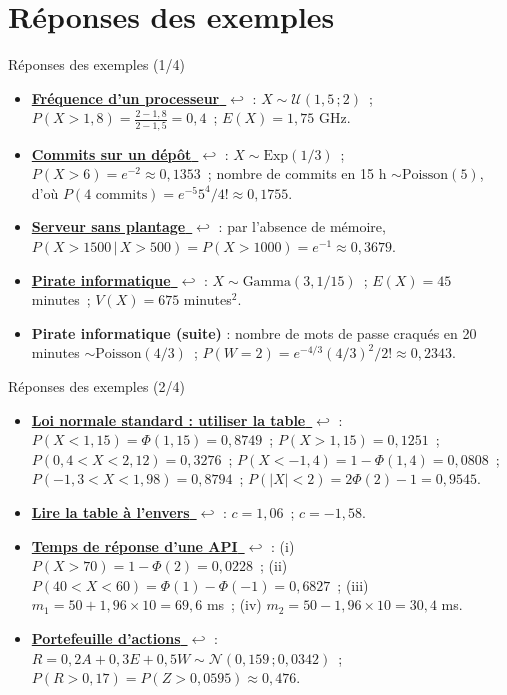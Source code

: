 \documentclass{BeamerTemplate}
\newcommand{\retour}[2]{\hyperlink{#1}{\textbf{#2}~{\color{gray}$\hookleftarrow$}}}
\begin{document}
\section{Réponses des exemples}

\begin{frame}[t,label=rep-ex1]{Réponses des exemples (1/4)}
\footnotesize
\begin{itemize}\itemsep4pt
\item \retour{exfreq}{Fréquence d'un processeur} : $X\sim\mathcal{U}(1{,}5\,;2)$~;
$P(X>1{,}8)=\frac{2-1{,}8}{2-1{,}5}=0{,}4$~; $E(X)=1{,}75$ GHz.
\item \retour{excommits}{Commits sur un dépôt} : $X\sim\text{Exp}(1/3)$~; $P(X>6)=e^{-2}\approx0{,}1353$~;
nombre de commits en 15 h $\sim\text{Poisson}(5)$, d'où $P(4\text{ commits})=e^{-5}5^4/4!\approx0{,}1755$.
\item \retour{exserveur}{Serveur sans plantage} : par l'absence de mémoire,
$P(X>1500\,|\,X>500)=P(X>1000)=e^{-1}\approx0{,}3679$.
\item \retour{expirate}{Pirate informatique} : $X\sim\text{Gamma}(3,1/15)$~; $E(X)=45$ minutes~;
$V(X)=675$ minutes$^2$.
\item \textbf{Pirate informatique (suite)} : nombre de mots de passe craqués en 20 minutes
$\sim\text{Poisson}(4/3)$~; $P(W=2)=e^{-4/3}(4/3)^2/2!\approx0{,}2343$.
\end{itemize}
\end{frame}


\begin{frame}[t,label=rep-ex2]{Réponses des exemples (2/4)}
\footnotesize
\begin{itemize}\itemsep4pt
\item \retour{exnorm}{Loi normale standard : utiliser la table} : $P(X<1{,}15)=\Phi(1{,}15)=0{,}8749$~;
$P(X>1{,}15)=0{,}1251$~; $P(0{,}4<X<2{,}12)=0{,}3276$~; $P(X<-1{,}4)=1-\Phi(1{,}4)=0{,}0808$~;
$P(-1{,}3<X<1{,}98)=0{,}8794$~; $P(|X|<2)=2\Phi(2)-1=0{,}9545$.
\item \retour{exenvers}{Lire la table à l'envers} : $c=1{,}06$~; $c=-1{,}58$.
\item \retour{exapi}{Temps de réponse d'une API} : (i) $P(X>70)=1-\Phi(2)=0{,}0228$~;
(ii) $P(40<X<60)=\Phi(1)-\Phi(-1)=0{,}6827$~;
(iii) $m_1=50+1{,}96\times10=69{,}6$ ms~; (iv) $m_2=50-1{,}96\times10=30{,}4$ ms.
\item \retour{exportefeuille}{Portefeuille d'actions} : $R=0{,}2A+0{,}3E+0{,}5W\sim\mathcal{N}(0{,}159\,;0{,}0342)$~;
$P(R>0{,}17)=P(Z>0{,}0595)\approx0{,}476$.
\end{itemize}
\end{frame}
\end{document}

